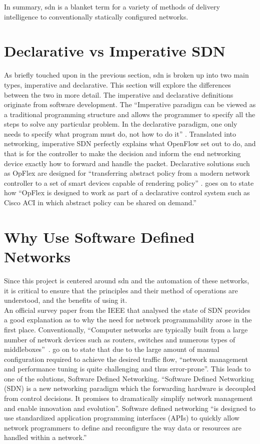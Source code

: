 In summary, \gls{sdn} is a blanket term for a variety of methods of delivery intelligence to conventionally statically configured networks.

\section{Declarative vs Imperative SDN}
\label{litreview:declarativevsimperative}
As briefly touched upon in the previous section, \gls{sdn} is broken up into two main types, imperative and declarative. This section will explore the differences between the two in more detail. The imperative and declarative definitions originate from software development. The ``Imperative paradigm can be viewed as a traditional programming structure and allows the programmer to specify all the steps to solve any particular problem. In the declarative paradigm, one only needs to specify what program must do, not how to do it'' \citep{LATIF2020102563}. Translated into networking, imperative SDN perfectly explains what OpenFlow set out to do, and that is for the controller to make the decision and inform the end networking device exactly how to forward and handle the packet. Declarative solutions such as OpFlex are designed for ``transferring abstract policy from a modern network controller to a set of smart devices capable of rendering policy'' \cite{bhardwaj_2020}. \citeauthor{bhardwaj_2020} goes on to state how ``OpFlex is designed to work as part of a declarative control system such as Cisco ACI in which abstract policy can be shared on demand.''


\section{Why Use Software Defined Networks}
\label{litreview:overview}

Since this project is centered around \gls{sdn} and the
automation of these networks, it is critical to ensure that the principles and
their method of operations are understood, and the benefits of using it.\\
An official survey paper from the IEEE that analysed the state of SDN provides
a good explanation as to why the need for network programmability arose in the
first place. Conventionally, “Computer networks are typically built from a
large number of network devices such as routers, switches and numerous types of
middleboxes”~\cite{1}. \citet{1} go on to state that due to the large
amount of manual configuration required to achieve the desired traffic flow,
“network management and performance tuning is quite challenging and thus
error-prone”.
This leads to one of the solutions, Software Defined Networking. “Software
Defined Networking (SDN) is a new networking paradigm which the forwarding
hardware is decoupled from control decisions. It promises to dramatically
simplify network management and enable innovation and evolution”. Software
defined networking “is designed to use standardized application programming
interfaces (APIs) to quickly allow network programmers to define and
reconfigure the way data or resources are handled within a network.” \cite{9}

